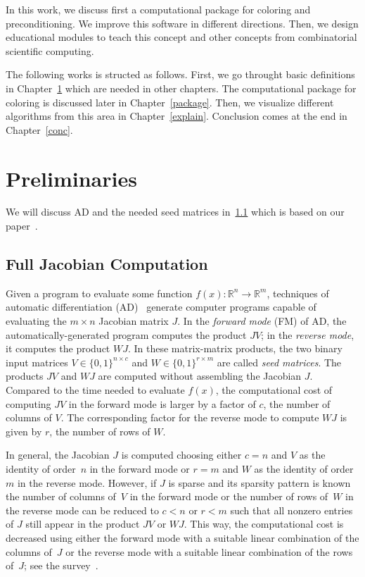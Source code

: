\documentclass[12pt, oneside]{book}
\newcommand{\setR}{\ensuremath{\mathbb{R}}}
\newcommand{\col}{\ensuremath{c}}
\newcommand{\row}{\ensuremath{r}}
\begin{document}
In this work, we discuss first a computational package for coloring and preconditioning.
We improve this software in different directions. Then, we design educational modules
to teach this concept and other concepts from combinatorial scientific computing.

The following works is structed as follows.
First, we go throught basic definitions in Chapter~\ref{prel} which are needed in other chapters.
The computational package for coloring is discussed later in Chapter~\ref{package}.
Then, we visualize different algorithms from this area in Chapter~\ref{explain}.
Conclusion comes at the end in Chapter~\ref{conc}.


\chapter{Preliminaries}
\label{prel}
We will discuss AD and the needed seed matrices in~\ref{s.seedmatrix} which is based on
our paper~\cite{2014:09}.
\section{Full Jacobian Computation}
\label{s.seedmatrix}
Given a program to evaluate some function $f(x) : \setR^n \rightarrow \setR^m$,
techniques of automatic differentiation (AD)~\cite{Griewank2008EDP,Rall1981ADT} generate
computer programs capable of evaluating the $m \times n$ Jacobian matrix $J$. In the
\emph{forward mode} (FM) of AD, the automatically-generated program computes the product
$JV$; in the \emph{reverse mode}, it computes the product $WJ$. In these matrix-matrix
products, the two binary input matrices $V \in \{0,1\}^{n\times \col}$ and $W\in
\{0,1\}^{\row\times m}$ are called \emph{seed matrices}. The products $JV$ and $WJ$ are
computed without assembling the Jacobian $J$. Compared to the time needed to evaluate
$f(x)$, the computational cost of computing $JV$ in the forward mode is larger by a
factor of \col, the number of columns of $V$. The corresponding factor for the reverse
mode to compute $WJ$ is given by \row, the number of rows of $W$.

In general, the Jacobian $J$ is computed choosing either $c=n$ and $V$ as the identity of
order~$n$ in the forward mode or $r = m$ and $W$ as the identity of order $m$ in the
reverse mode. However, if $J$ is sparse and its sparsity pattern is known the number of
columns of~$V$ in the forward mode or the number of rows of~$W$ in the reverse mode can
be reduced to $\col < n$ or $\row < m$ such that all nonzero entries of $J$ still appear
in the product $JV$ or $WJ$. This way, the computational cost is decreased using either
the forward mode with a suitable linear combination of the columns of~$J$ or the reverse
mode with a suitable linear combination of the rows of~$J$; see the
survey~\cite{Gebremedhin05whatcolor}.
\end{document}
